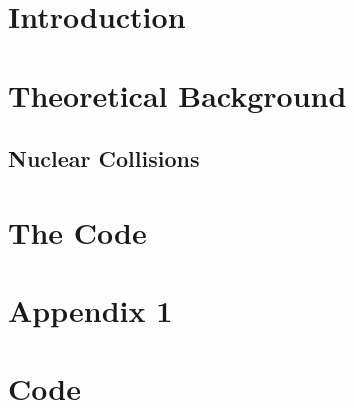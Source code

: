 
\tableofcontents
\clearpage

\pagestyle{scrheadings}
\ofoot[\pagemark]{\pagemark}
\cfoot[]{}

\setlength{\oddsidemargin}{8pt}
\setlength{\evensidemargin}{23pt}

%

\newpage
{}
\setcounter{page}{1}
\chapter{Introduction}
\label{sec:intro}


\chapter{Theoretical Background}
\label{sec:theory}
\section{Nuclear Collisions}


\chapter{The Code}
\label{sec:code}

%



\printnomenclature
{}


\newpage
\appendix
{}
\chapter{Appendix 1}
\label{app:brho}

\chapter{Code}
\label{app:code}

